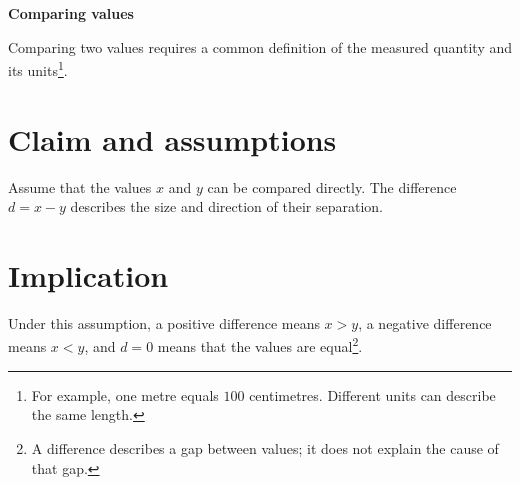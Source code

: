 \def\lakitlanguageprofile{english}
\def\lakitmainlanguage{english}
\def\lakitdocumentclass{article}
\def\lakitclassoptions{11pt,a4paper}
\def\lakitgeometryoptions{margin=2.2cm,headheight=14pt}
\def\lakitlinespread{1.18}
\def\lakitparagraphstyle{block}





{\LARGE\sffamily\bfseries\noindent Comparing values\par}\medskip
Comparing two values requires a common definition of the measured quantity and
its units\footnote{For example, one metre equals $100$ centimetres. Different
units can describe the same length.}.
\section{Claim and assumptions}
Assume that the values $x$ and $y$ can be compared directly.
The difference $d=x-y$ describes the size and direction of their separation.
\PrintDocNotes
\section{Implication}
Under this assumption, a positive difference means $x>y$,
a negative difference means $x<y$, and $d=0$ means that the values are
equal\footnote{A difference describes a gap between values; it does not explain
the cause of that gap.}.

